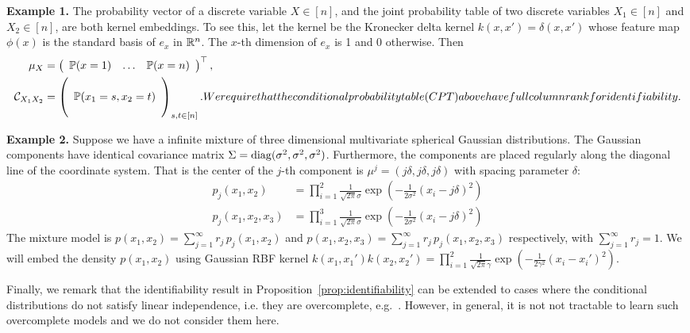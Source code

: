 \documentclass{article}
\begin{document}
{\bf Example 1.} The probability vector of a discrete variable $X \in [n]$, and the joint probability table of two discrete variables $X_1 \in [n]$ and $X_2 \in [n]$, are both kernel embeddings. To see this, let the kernel be the Kronecker delta kernel $k(x,x') = \delta(x,x')$ whose feature map $\phi(x)$ is the standard basis of $e_{x}$ in $\mathbb{R}^n$. The $x$-th dimension of $e_{x}$ is 1 and 0 otherwise. Then
\begin{align}
    \mu_X
		& = \left(
      \begin{array}{ccc}
         \mathbb{P}(x = 1) &
         \hdots &
         \mathbb{P}(x = n)
       \end{array}
    \right)^\top, \nonumber \\
		\mathcal{C}_{X_1X_2}
		&=
		\left(
        \begin{array}{c}
            \cr
            \mathbb{P}(x_1=s,x_2=t) \cr
						\cr
        \end{array}
    \right)_{s,t \in [n]}. \nonumber
We require that the conditional probability table (CPT) above have full column rank for identifiability.
\end{align}


{\bf Example 2.} Suppose we have a infinite mixture of three dimensional multivariate spherical Gaussian distributions. The Gaussian components have identical covariance matrix $\Sigma = \mathop{\mathrm{diag}}(\sigma^2,\sigma^2,\sigma^2)$. Furthermore, the components are placed regularly along the diagonal line of the coordinate system. That is the center of the $j$-th component is $\mu^j=(j\delta,j\delta,j\delta)$ with spacing parameter $\delta$:
\begin{align*}
  p_j(x_1,x_2) &= \prod_{i=1}^2 \frac{1}{\sqrt{2\pi}\sigma}\exp(-\frac{1}{2\sigma^2}(x_i -j\delta)^2)\\
  p_j(x_1,x_2,x_3) &= \prod_{i=1}^3 \frac{1}{\sqrt{2\pi}\sigma}\exp(-\frac{1}{2\sigma^2}(x_i -j\delta)^2)
\end{align*}
The mixture model is $p(x_1,x_2) = \sum_{j=1}^{\infty} r_j\, p_j(x_1,x_2)$ and
$p(x_1,x_2,x_3) = \sum_{j=1}^{\infty} r_j\, p_j(x_1,x_2,x_3)$ respectively, with $\sum_{j=1}^{\infty} r_j = 1$.
We will embed the density $p(x_1,x_2)$ using Gaussian RBF kernel $k(x_1,x_1')k(x_2,x_2') = \prod_{i=1}^2 \frac{1}{\sqrt{2\pi}\gamma}\exp(-\frac{1}{2\gamma^2}(x_i - x_i')^2)$.

Finally, we remark that the identifiability result in Proposition~\ref{prop:identifiability} can be extended to cases where the conditional distributions do not satisfy linear independence, i.e. they are overcomplete, e.g.~\cite{Kruskal:77,DeLathauwerEtal:FOOBI,AnandkumarEtal:overcomplete13}. However, in general, it is not not tractable to learn such overcomplete models and we do not consider them here. 
\end{document}
